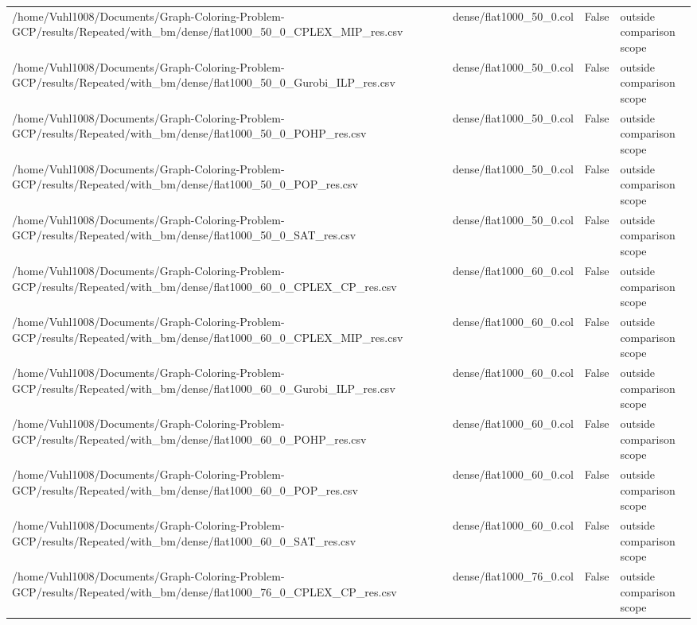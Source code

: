 \begin{table}[htbp]
\begin{tabular}{llll}
/home/Vuhl1008/Documents/Graph-Coloring-Problem-GCP/results/Repeated/with\_bm/dense/flat1000\_50\_0\_CPLEX\_MIP\_res.csv & dense/flat1000\_50\_0.col & False & outside comparison scope \\
/home/Vuhl1008/Documents/Graph-Coloring-Problem-GCP/results/Repeated/with\_bm/dense/flat1000\_50\_0\_Gurobi\_ILP\_res.csv & dense/flat1000\_50\_0.col & False & outside comparison scope \\
/home/Vuhl1008/Documents/Graph-Coloring-Problem-GCP/results/Repeated/with\_bm/dense/flat1000\_50\_0\_POHP\_res.csv & dense/flat1000\_50\_0.col & False & outside comparison scope \\
/home/Vuhl1008/Documents/Graph-Coloring-Problem-GCP/results/Repeated/with\_bm/dense/flat1000\_50\_0\_POP\_res.csv & dense/flat1000\_50\_0.col & False & outside comparison scope \\
/home/Vuhl1008/Documents/Graph-Coloring-Problem-GCP/results/Repeated/with\_bm/dense/flat1000\_50\_0\_SAT\_res.csv & dense/flat1000\_50\_0.col & False & outside comparison scope \\
/home/Vuhl1008/Documents/Graph-Coloring-Problem-GCP/results/Repeated/with\_bm/dense/flat1000\_60\_0\_CPLEX\_CP\_res.csv & dense/flat1000\_60\_0.col & False & outside comparison scope \\
/home/Vuhl1008/Documents/Graph-Coloring-Problem-GCP/results/Repeated/with\_bm/dense/flat1000\_60\_0\_CPLEX\_MIP\_res.csv & dense/flat1000\_60\_0.col & False & outside comparison scope \\
/home/Vuhl1008/Documents/Graph-Coloring-Problem-GCP/results/Repeated/with\_bm/dense/flat1000\_60\_0\_Gurobi\_ILP\_res.csv & dense/flat1000\_60\_0.col & False & outside comparison scope \\
/home/Vuhl1008/Documents/Graph-Coloring-Problem-GCP/results/Repeated/with\_bm/dense/flat1000\_60\_0\_POHP\_res.csv & dense/flat1000\_60\_0.col & False & outside comparison scope \\
/home/Vuhl1008/Documents/Graph-Coloring-Problem-GCP/results/Repeated/with\_bm/dense/flat1000\_60\_0\_POP\_res.csv & dense/flat1000\_60\_0.col & False & outside comparison scope \\
/home/Vuhl1008/Documents/Graph-Coloring-Problem-GCP/results/Repeated/with\_bm/dense/flat1000\_60\_0\_SAT\_res.csv & dense/flat1000\_60\_0.col & False & outside comparison scope \\
/home/Vuhl1008/Documents/Graph-Coloring-Problem-GCP/results/Repeated/with\_bm/dense/flat1000\_76\_0\_CPLEX\_CP\_res.csv & dense/flat1000\_76\_0.col & False & outside comparison scope \\

\end{tabular}
\end{table}
